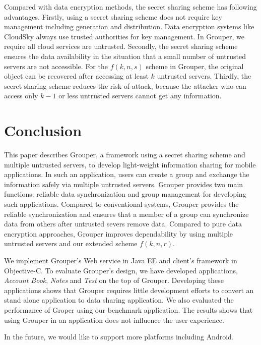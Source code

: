 \documentclass[twocolumn,10pt]{article}
\begin{document}
Compared with data encryption methods, the secret sharing scheme has following advantages.
Firstly, using a secret sharing scheme does not require key management including generation and distribution.
Data encryption systems like CloudSky always use trusted authorities for key management.
In Grouper, we require all cloud services are untrusted.
Secondly, the secret sharing scheme ensures the data availability in the situation that a small number of untrusted servers are not accessible.
For the $f(k, n, s)$ scheme in Grouper, the original object can be recovered after accessing at least $k$ untrusted servers.
Thirdly, the secret sharing scheme reduces the risk of attack, because the attacker who can access only $k-1$ or less untrusted servers cannot get any information.

\section{Conclusion}

This paper describes Grouper, a framework using a secret sharing scheme and multiple untrusted servers, to develop light-weight information sharing for mobile applications.
In such an application, users can create a group and exchange the information safely via multiple untrusted servers.
Grouper provides two main functions: reliable data synchronization and group management for developing such applications.
Compared to conventional systems, Grouper provides the reliable synchronization and ensures that a member of a group can synchronize data from others after untrusted severs remove data.
Compared to pure data encryption approaches, Grouper improves dependability by using multiple untrusted servers and our extended scheme $f(k, n, r)$.

We implement Grouper's Web service in Java EE and client's framework in Objective-C. 
To evaluate Grouper's design, we have developed applications, \emph{Account Book}, \emph{Notes} and \emph{Test} on the top of Grouper.
Developing these applications shows that Grouper requires little development efforts to convert an stand alone application to data sharing application.
We also evaluated the performance of Groper using our benchmark application.
The results shows that using Grouper in an application does not influence the user experience.

In the future, we would like to support more platforms including Android.


{
	\footnotesize
	
}
\end{document}
